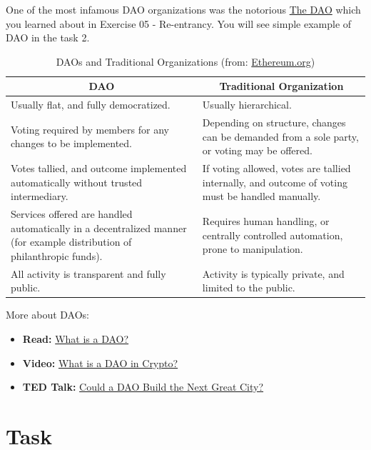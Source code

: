 \documentclass[12pt]{article}
\begin{document}
\noindent
One of the most infamous DAO organizations was the notorious \href{https://en.wikipedia.org/wiki/The_DAO}{The DAO} which you learned about in Exercise 05 - Re-entrancy. You will see simple example of DAO in the task 2.

\begin{table}[H]
\centering
\footnotesize
\begin{tabular}{|p{}|p{}|}
\hline
\multicolumn{1}{|c|}{\textbf{DAO}} & \multicolumn{1}{c|}{\textbf{Traditional Organization}} \\
\hline
Usually flat, and fully democratized. & Usually hierarchical. \\
\hline
Voting required by members for any changes to be implemented. & Depending on structure, changes can be demanded from a sole party, or voting may be offered. \\
\hline
Votes tallied, and outcome implemented automatically without trusted intermediary. & If voting allowed, votes are tallied internally, and outcome of voting must be handled manually. \\
\hline
Services offered are handled automatically in a decentralized manner (for example distribution of philanthropic funds). & Requires human handling, or centrally controlled automation, prone to manipulation. \\
\hline
All activity is transparent and fully public. & Activity is typically private, and limited to the public. \\
\hline
\end{tabular}
\caption{DAOs and Traditional Organizations (from: \href{https://ethereum.org/dao/}{Ethereum.org})}
\label{tab:dao-comparison}
\end{table}

\medskip
\noindent
More about DAOs:
\begin{itemize}
  \item \textbf{Read:} \href{https://ethereum.org/dao/#what-are-daos}{What is a DAO?}
  \item \textbf{Video:} \href{https://www.youtube.com/watch?v=KHm0uUPqmVE}{What is a DAO in Crypto?}
  \item \textbf{TED Talk:} \href{https://www.youtube.com/watch?v=zTStDvUtQWc}{Could a DAO Build the Next Great City?}
\end{itemize}

\section{Task}
\end{document}
